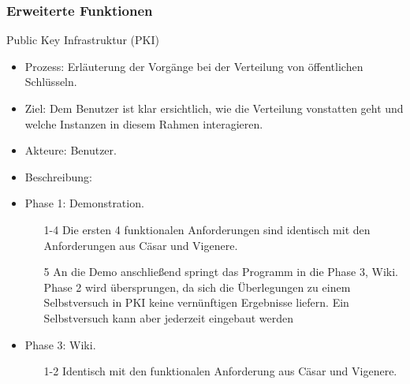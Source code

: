 \documentclass{article}
\begin{document}
\subsubsection{Erweiterte Funktionen}

\begin{FA}[start=500]
\item Public Key Infrastruktur (PKI)
\end{FA}
\begin{itemize}[label={}]
\item Prozess: Erläuterung der Vorgänge bei der Verteilung von öffentlichen Schlüsseln.
\item Ziel: Dem Benutzer ist klar ersichtlich, wie die Verteilung vonstatten geht und welche Instanzen in diesem Rahmen 
            interagieren.
\item Akteure: Benutzer.
\item Beschreibung:
\item Phase 1: Demonstration.
\begin{enumerate}
 \item[1-4] Die ersten 4 funktionalen Anforderungen sind identisch mit den Anforderungen aus Cäsar und Vigenere. 
 \item[5] An die Demo anschließend springt das Programm in die Phase 3, Wiki. Phase 2 wird übersprungen, da sich die Überlegungen zu einem Selbstversuch in PKI keine vernünftigen Ergebnisse liefern. Ein Selbstversuch kann aber jederzeit eingebaut werden
\end{enumerate}
\item Phase 3: Wiki.
\begin{enumerate}
 \item[1-2] Identisch mit den funktionalen Anforderung aus Cäsar und Vigenere.
\end{enumerate}
\end{itemize}
\end{document}
